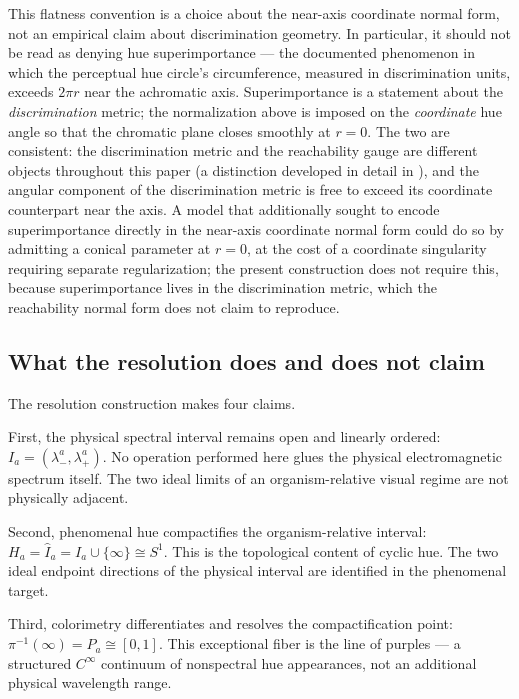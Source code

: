 \documentclass[preprint,12pt,authoryear]{elsarticle}
\theoremstyle{plain}
\theoremstyle{definition}
\theoremstyle{remark}
\begin{document}
This flatness convention is a choice about the near-axis coordinate normal form, not an empirical claim about discrimination geometry. In particular, it should not be read as denying hue superimportance --- the documented phenomenon \citep{Indow1988} in which the perceptual hue circle's circumference, measured in discrimination units, exceeds $2\pi r$ near the achromatic axis. Superimportance is a statement about the \emph{discrimination} metric; the normalization above is imposed on the \emph{coordinate} hue angle so that the chromatic plane closes smoothly at $r=0$. The two are consistent: the discrimination metric and the reachability gauge are different objects throughout this paper (a distinction developed in detail in ), and the angular component of the discrimination metric is free to exceed its coordinate counterpart near the axis. A model that additionally sought to encode superimportance directly in the near-axis coordinate normal form could do so by admitting a conical parameter at $r=0$, at the cost of a coordinate singularity requiring separate regularization; the present construction does not require this, because superimportance lives in the discrimination metric, which the reachability normal form does not claim to reproduce.

\subsection{What the resolution does and does not claim}
\label{subsec:resolution-scope}

\noindent The resolution construction makes four claims.

First, the physical spectral interval remains open and linearly ordered: $I_a=(\lambda_-^a,\lambda_+^a)$. No operation performed here glues the physical electromagnetic spectrum itself. The two ideal limits of an organism-relative visual regime are not physically adjacent.

Second, phenomenal hue compactifies the organism-relative interval: $H_a=\widehat I_a=I_a\cup\{\infty\}\cong S^1$. This is the topological content of cyclic hue. The two ideal endpoint directions of the physical interval are identified in the phenomenal target.

Third, colorimetry differentiates and resolves the compactification point: $\pi^{-1}(\infty)=P_a\cong[0,1]$. This exceptional fiber is the line of purples --- a structured $C^\infty$ continuum of nonspectral hue appearances, not an additional physical wavelength range.
\end{document}

